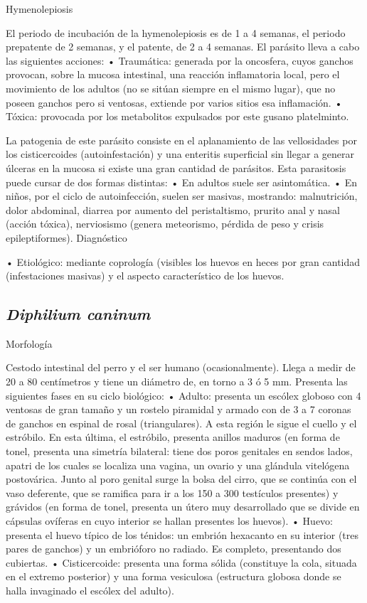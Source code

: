 Hymenolepiosis

El periodo de incubación de la hymenolepiosis es de 1 a 4 semanas, el periodo prepatente de 2 semanas, y el patente, de 2 a 4 semanas. El parásito lleva a cabo las siguientes acciones:
• Traumática: generada por la oncosfera, cuyos ganchos provocan, sobre la mucosa intestinal, una reacción inflamatoria local, pero el movimiento de los adultos (no se sitúan siempre en el mismo lugar), que no poseen ganchos pero si ventosas, extiende por varios sitios esa inflamación.
• Tóxica: provocada por los metabolitos expulsados por este gusano platelminto.

La patogenia de este parásito consiste en el aplanamiento de las vellosidades por los cisticercoides (autoinfestación) y una enteritis superficial sin llegar a generar úlceras en la mucosa si existe una gran cantidad de parásitos. Esta parasitosis puede cursar de dos formas distintas:
• En adultos suele ser asintomática.
• En niños, por el ciclo de autoinfección, suelen ser masivas, mostrando: malnutrición, dolor abdominal, diarrea por aumento del peristaltismo, prurito anal y nasal (acción tóxica), nerviosismo (genera meteorismo, pérdida de peso y crisis epileptiformes).
Diagnóstico

• Etiológico: mediante coprología (visibles los huevos en heces por gran cantidad (infestaciones masivas) y el aspecto característico de los huevos.

\newpage
\subsection{\textit{Diphilium caninum}}
Morfología

Cestodo intestinal del perro y el ser humano (ocasionalmente). Llega a medir de 20 a 80 centímetros y tiene un diámetro de, en torno a 3 ó 5 mm. Presenta las siguientes fases en su ciclo biológico:
• Adulto: presenta un escólex globoso con 4 ventosas de gran tamaño y un rostelo piramidal y armado con de 3 a 7 coronas de ganchos en espinal de rosal (triangulares). A esta región le sigue el cuello y el estróbilo. En esta última, el estróbilo, presenta anillos maduros (en forma de tonel, presenta una simetría bilateral: tiene dos poros genitales en sendos lados, apatri de los cuales se localiza una vagina, un ovario y una glándula vitelógena postovárica. Junto al poro genital surge la bolsa del cirro, que se continúa con el vaso deferente, que se ramifica para ir a los 150 a 300 testículos presentes) y grávidos (en forma de tonel, presenta un útero muy desarrollado que se divide en cápsulas ovíferas en cuyo interior se hallan presentes los huevos).
• Huevo: presenta el huevo típico de los ténidos: un embrión hexacanto en su interior (tres pares de ganchos) y un embrióforo no radiado. Es completo, presentando dos cubiertas.
• Cisticercoide: presenta una forma sólida (constituye la cola, situada en el extremo posterior) y una forma vesiculosa (estructura globosa donde se halla invaginado el escólex del adulto).

